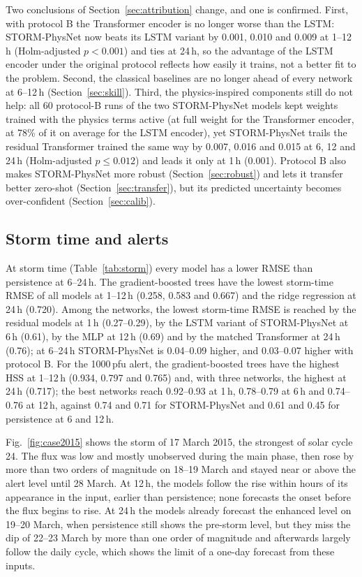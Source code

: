 \documentclass[a4paper,fleqn]{cas-dc}
\begin{document}
Two conclusions of Section~\ref{sec:attribution} change, and one is confirmed. First, with protocol B the
Transformer encoder is no longer worse than the LSTM: STORM-PhysNet now beats its LSTM variant by 0.001, 0.010 and
0.009 at 1--12\,h (Holm-adjusted \(p<0.001\)) and ties at 24\,h, so the advantage of the LSTM encoder under the
original protocol reflects how easily it trains, not a better fit to the problem. Second, the classical baselines
are no longer ahead of every network at 6--12\,h (Section~\ref{sec:skill}). Third, the physics-inspired components
still do not help: all 60 protocol-B runs of the two STORM-PhysNet models kept weights trained with the physics terms
active (at full weight for the Transformer encoder, at 78\% of it on average for the LSTM encoder), yet
STORM-PhysNet trails the residual Transformer trained the same way by 0.007, 0.016 and 0.015 at 6, 12 and 24\,h
(Holm-adjusted \(p\le0.012\)) and leads it only at 1\,h (0.001). Protocol B also makes STORM-PhysNet more robust
(Section~\ref{sec:robust}) and lets it transfer better zero-shot (Section~\ref{sec:transfer}), but its predicted
uncertainty becomes over-confident (Section~\ref{sec:calib}).

\subsection{Storm time and alerts}
\label{sec:storm}
At storm time (Table~\ref{tab:storm}) every model has a lower RMSE than persistence at 6--24\,h. The
gradient-boosted trees have the lowest storm-time RMSE of all models at 1--12\,h (0.258, 0.583 and 0.667) and the
ridge regression at 24\,h (0.720). Among the networks, the lowest storm-time RMSE is reached by the residual models
at 1\,h (0.27--0.29), by the LSTM variant of STORM-PhysNet at 6\,h (0.61), by the MLP at 12\,h (0.69) and by the
matched Transformer at 24\,h (0.76); at 6--24\,h STORM-PhysNet is 0.04--0.09 higher, and 0.03--0.07 higher with
protocol B. For the 1000\,pfu alert, the
gradient-boosted trees have the highest HSS at 1--12\,h (0.934, 0.797 and 0.765) and, with three networks,
the highest at 24\,h (0.717); the best networks reach 0.92--0.93 at 1\,h, 0.78--0.79 at 6\,h and 0.74--0.76 at
12\,h, against 0.74 and 0.71 for STORM-PhysNet and
0.61 and 0.45 for persistence at 6 and 12\,h.

Fig.~\ref{fig:case2015} shows the storm of 17 March 2015, the strongest of solar cycle 24. The flux was low and
mostly unobserved during the main phase, then rose by more than two orders of magnitude on 18--19 March and
stayed near or above the alert level until 28 March. At 12\,h, the models follow the rise within hours of its
appearance in the input, earlier than persistence; none forecasts the onset before the flux begins to rise.
At 24\,h the models already forecast the enhanced level on 19--20 March, when persistence still shows the
pre-storm level, but they miss the dip of 22--23 March by more than one order of magnitude and afterwards
largely follow the daily cycle, which shows the limit of a one-day forecast from these inputs.
\end{document}
